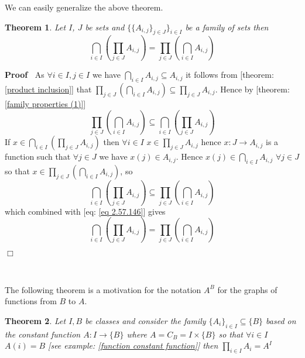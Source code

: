 \documentclass{book}
\newenvironment{proof}{\noindent\textbf{Proof\ }}{\hspace*{\fill}$\Box$\medskip}
\newtheorem{theorem}{Theorem}
\begin{document}
We can easily generalize the above theorem.

\begin{theorem}
  \label{product intersection of a product}Let $I$, $J$ be sets and $\{ \{
  A_{i, j} \}_{j \in J} \}_{i \in I}$ be a family of sets then
  \[ \bigcap_{i \in I} \left( \prod_{j \in J} A_{i, j} \right) = \prod_{j \in
     J} \left( \bigcap_{i \in I} A_{i, j} \right) \]
\end{theorem}

\begin{proof}
  As $\forall i \in I, j \in I$ we have $\bigcap_{i \in I} A_{i, j} \subseteq
  A_{i, j}$ it follows from [theorem: \ref{product inclusion}] that $\prod_{j
  \in J} \left( \bigcap_{i \in I} A_{i, j} \right) \subseteq \prod_{j \in J}
  A_{i, j}$. Hence by [theorem: \ref{family properties (1)}]
  \begin{equation}
    \label{eq 2.57.146} \prod_{j \in J} \left( \bigcap_{i \in I} A_{i, j}
    \right) \subseteq \bigcap_{i \in I} \left( \prod_{j \in J} A_{i, j}
    \right)
  \end{equation}
  If $x \in \bigcap_{i \in I} \left( \prod_{j \in J} A_{i, j} \right)$ then
  $\forall i \in I$ $x \in \prod_{j \in J} A_{i, j}$ hence $x : J \rightarrow
  A_{i, j}$ is a function such that $\forall j \in J$ we have $x (j) \in A_{i,
  j}$. Hence $x (j) \in \bigcap_{i \in I} A_{i, j}$ $\forall j \in J$ so that
  $x \in \prod_{j \in J} \left( \bigcap_{i \in I} A_{i, j} \right)$, so
  \[ \bigcap_{i \in I} \left( \prod_{j \in J} A_{i, j} \right) \subseteq
     \prod_{j \in J} \left( \bigcap_{i \in I} A_{i, j} \right) \]
  which combined with [eq: \ref{eq 2.57.146}] gives
  \[ \bigcap_{i \in I} \left( \prod_{j \in J} A_{i, j} \right) = \prod_{j \in
     J} \left( \bigcap_{i \in I} A_{i, j} \right) \]
  
\end{proof}

\

The following theorem is a motivation for the notation $A^B$ for the graphs
of functions from $B$ to $A$.

\begin{theorem}
  \label{product and power}Let $I, B$ be classes and consider the family $\{
  A_i \}_{i \in I} \subseteq \{ B \}$ based on the constant function $A : I
  \rightarrow \{ B \}$ where $A = C_B = I \times \{ B \}$ so that $\forall i
  \in I$ $A (i) = B$ [see example: \ref{function constant function}] then
  $\prod_{i \in I} A_i = A^I$
\end{theorem}
\end{document}
